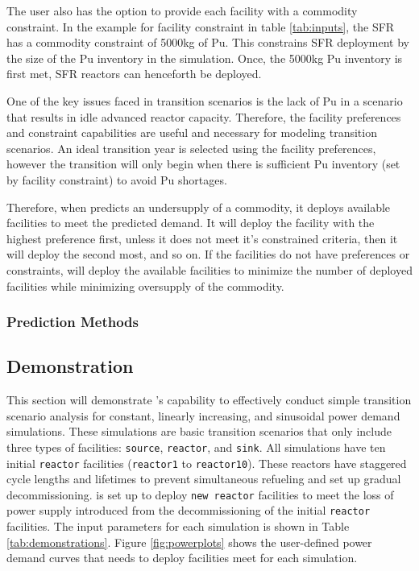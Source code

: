     The user also has the option to provide each facility with a 
    commodity constraint. 
    In the example for facility constraint in table \ref{tab:inputs}, 
    the \gls{SFR} has a commodity constraint of 5000kg of Pu. 
    This constrains \gls{SFR} deployment by the size of the Pu inventory 
    in the simulation. 
    Once, the 5000kg Pu inventory is first met, \gls{SFR} reactors can 
    henceforth be deployed. 
    
    One of the key issues faced in transition scenarios is the lack 
    of Pu in a scenario that results in idle advanced reactor capacity. 
    Therefore, the facility preferences and constraint capabilities 
    are useful and necessary for modeling transition scenarios. 
    An ideal transition year is selected using the facility 
    preferences, however the transition will only begin when there 
    is sufficient Pu inventory (set by facility constraint) 
    to avoid Pu shortages. 
    
    Therefore, when \deploy predicts an undersupply of a commodity, 
    it deploys available facilities to meet the predicted demand. 
    It will deploy the facility with the highest preference first, 
    unless it does not meet it's constrained criteria, then it will 
    deploy the second most, and so on. 
    If the facilities do not have preferences or constraints, \deploy 
    will deploy the available facilities to minimize the number of 
    deployed facilities while minimizing oversupply of the commodity.

\subsubsection{\textbf{Prediction Methods}}

\subsection{\deploy Demonstration}
\label{sec:demo}

This section will demonstrate \deploy's capability 
to effectively conduct simple transition scenario analysis
for constant, linearly increasing, and 
sinusoidal power demand simulations.
These simulations are basic transition scenarios that only include 
three types of facilities: \texttt{source}, \texttt{reactor}, and 
\texttt{sink}. 
All simulations have ten initial \texttt{reactor} facilities 
(\texttt{reactor1} to \texttt{reactor10}). 
These reactors have staggered cycle lengths and lifetimes to prevent 
simultaneous refueling and set up gradual decommissioning. 
\deploy is set up to deploy \texttt{new reactor} facilities
to meet the loss of power supply introduced from the decommissioning 
of the initial \texttt{reactor} facilities. 
The \deploy input parameters for each simulation is shown in Table 
\ref{tab:demonstrations}. 
Figure \ref{fig:powerplots} shows the user-defined power demand curves 
that \deploy needs to deploy facilities meet for each simulation.


